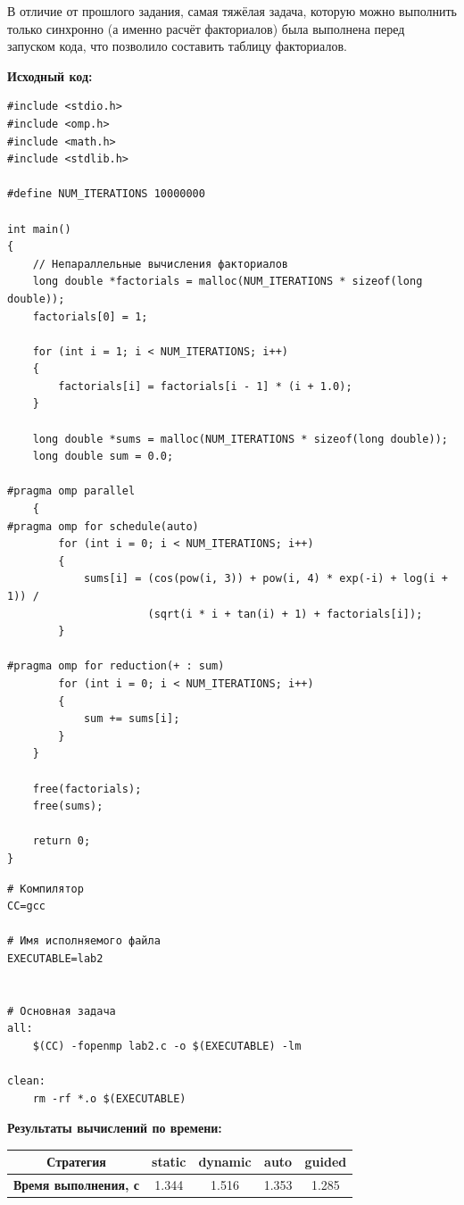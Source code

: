 \documentclass[a4paper,14pt]{extarticle}
\begin{document}
В отличие от прошлого задания, самая тяжёлая задача, которую можно выполнить только синхронно (а именно расчёт
факториалов) была выполнена перед запуском кода, что позволило составить таблицу факториалов.

\textbf{Исходный код:}
\begin{verbatim}
#include <stdio.h>
#include <omp.h>
#include <math.h>
#include <stdlib.h>

#define NUM_ITERATIONS 10000000

int main()
{
    // Непараллельные вычисления факториалов
    long double *factorials = malloc(NUM_ITERATIONS * sizeof(long double));
    factorials[0] = 1;

    for (int i = 1; i < NUM_ITERATIONS; i++)
    {
        factorials[i] = factorials[i - 1] * (i + 1.0);
    }

    long double *sums = malloc(NUM_ITERATIONS * sizeof(long double));
    long double sum = 0.0;

#pragma omp parallel
    {
#pragma omp for schedule(auto)
        for (int i = 0; i < NUM_ITERATIONS; i++)
        {
            sums[i] = (cos(pow(i, 3)) + pow(i, 4) * exp(-i) + log(i + 1)) /
                      (sqrt(i * i + tan(i) + 1) + factorials[i]);
        }

#pragma omp for reduction(+ : sum)
        for (int i = 0; i < NUM_ITERATIONS; i++)
        {
            sum += sums[i];
        }
    }

    free(factorials);
    free(sums);

    return 0;
}
\end{verbatim}

\begin{verbatim}
# Компилятор
CC=gcc

# Имя исполняемого файла
EXECUTABLE=lab2


# Основная задача
all: 
	$(CC) -fopenmp lab2.c -o $(EXECUTABLE) -lm

clean:
	rm -rf *.o $(EXECUTABLE)
\end{verbatim}

\textbf{Результаты вычислений по времени:}\\
\begin{tabular}{|c|c|c|c|c|}
    \hline
    \textbf{Стратегия} & static & dynamic & auto & guided \\ 
    \hline
    \textbf{Время выполнения, с} & 1.344 & 1.516 & 1.353 & 1.285 \\
    \hline
\end{tabular}\\
\end{document}
